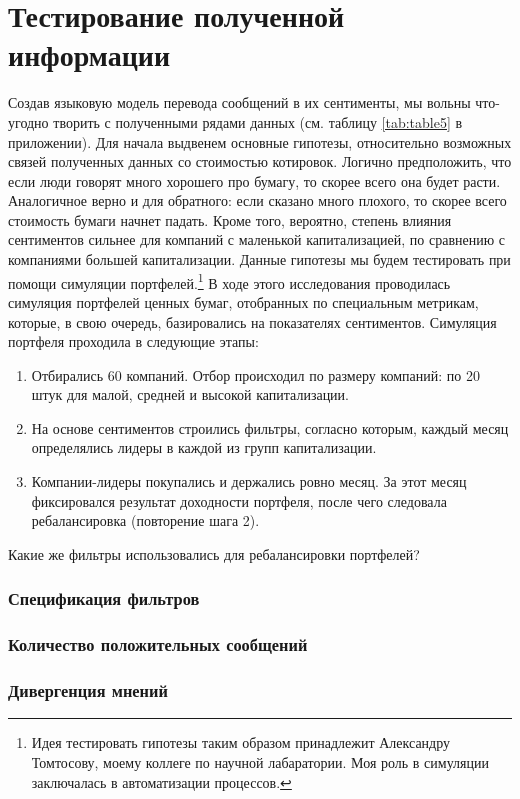 \documentclass{article}
\begin{document}
\section{Тестирование полученной информации}
Создав языковую модель перевода сообщений в их сентименты, мы вольны что-угодно творить с полученными рядами данных (см. таблицу \ref{tab:table5} в приложении). Для начала выдвенем основные гипотезы, относительно возможных связей полученных данных со стоимостью котировок. Логично предположить, что если люди говорят много хорошего про бумагу, то скорее всего она будет расти. Аналогичное верно и для обратного: если сказано много плохого, то скорее всего стоимость бумаги начнет падать. Кроме того, вероятно, степень влияния сентиментов сильнее для компаний с маленькой капитализацией, по сравнению с компаниями большей капитализации. Данные гипотезы мы будем тестировать при помощи симуляции портфелей.\footnote{Идея тестировать гипотезы таким образом принадлежит Александру Томтосову, моему коллеге по научной лабаратории. Моя роль в симуляции заключалась в автоматизации процессов.}
В ходе этого исследования проводилась симуляция портфелей ценных бумаг, отобранных по специальным метрикам, которые, в свою очередь, базировались на показателях сентиментов. Симуляция портфеля проходила в следующие этапы:

\begin{enumerate}
	\item Отбирались 60 компаний. Отбор происходил по размеру компаний: по 20 штук для малой, средней и высокой капитализации.
	\item На основе сентиментов строились фильтры, согласно которым, каждый месяц определялись лидеры в каждой из групп капитализации.
	\item Компании-лидеры покупались и держались ровно месяц. За этот месяц фиксировался результат доходности портфеля, после чего следовала ребалансировка (повторение шага 2).
\end{enumerate}

Какие же фильтры использовались для ребалансировки портфелей?
\subsubsection*{Спецификация фильтров}
\subsubsection{Количество положительных сообщений}
\subsubsection{Дивергенция мнений}
\end{document}

